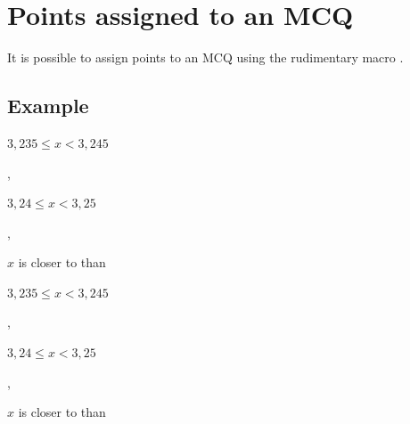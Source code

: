 \section{Points assigned to an MCQ}

It is possible to assign points to an MCQ using the  rudimentary macro .

  
\subsection{Example} 

 
\begin{tkzltxexample}[]
\begin{alterqcm}[symb = \dingsquare, lq=7cm]
{%
  {\begin{minipage}[t]{\linewidth-1cm}
     $3,235\leqslant x <3,245$\\
   \end{minipage}} ,   
  {\begin{minipage}[t]{\linewidth-1cm} 
     $3,24\leqslant x <3,25$\\
    \end{minipage}} ,
  {\begin{minipage}[t]{\linewidth-1cm}
     $x$ is closer to  than 
   \end{minipage}}}
\end{alterqcm}
\end{tkzltxexample}

\medskip
{}
  \begin{alterqcm}[symb = \dingsquare, lq=7cm]
  {{\begin{minipage}[t]{\linewidth-1cm}$3,235\leqslant x <3,245$\\
    \end{minipage}} ,
   {\begin{minipage}[t]{\linewidth-1cm} $3,24\leqslant x <3,25$\\
    \end{minipage}} ,
   {\begin{minipage}[t]{\linewidth-1cm}
       $x$ is closer to  than 
    \end{minipage}}}

\end{alterqcm}   
\endinput